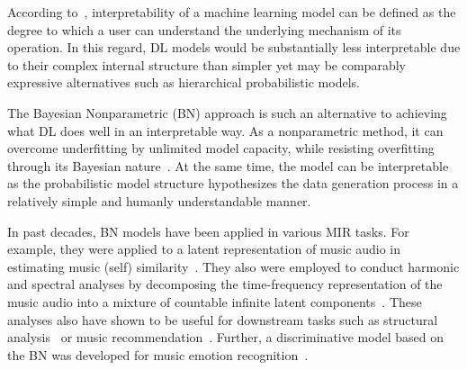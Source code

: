 \documentclass{article}
\begin{document}
According to~\cite{molnar2022, DBLP:journals/ai/Miller19}, interpretability of a machine learning model can be defined as the degree to which a user can understand the underlying mechanism of its operation. In this regard, DL models would be substantially less interpretable due to their complex internal structure than simpler yet may be comparably expressive alternatives such as hierarchical probabilistic models.

The Bayesian Nonparametric (BN) approach is such an alternative to achieving what DL does well in an interpretable way. As a nonparametric method, it can overcome underfitting by unlimited model capacity, while resisting overfitting through its Bayesian nature~\cite{DBLP:reference/ml/Teh17}.
At the same time, the model can be interpretable as the probabilistic model structure hypothesizes the data generation process in a relatively simple and humanly understandable manner.

In past decades, BN models have been applied in various MIR tasks. For example, they were applied to a latent representation of music audio in estimating music (self) similarity~\cite{DBLP:conf/icassp/QiPC07, DBLP:conf/ismir/HoffmanBC08}. They also were employed to conduct harmonic and spectral analyses by decomposing the time-frequency representation of the music audio into a mixture of countable infinite latent components~\cite{Hoffman09findinglatent, DBLP:conf/icassp/NakanoRKOS11}. These analyses also have shown to be useful for downstream tasks such as structural analysis~\cite{DBLP:conf/icassp/NakanoOKMK12} or music recommendation~\cite{DBLP:conf/ismir/YoshiiG09}. Further, a discriminative model based on the BN was developed for music emotion recognition~\cite{DBLP:journals/taffco/WangLCCH15}.
\end{document}
